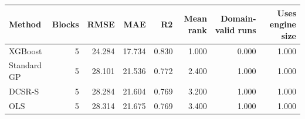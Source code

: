 \begin{tabular}{lrrrrrrr}
\toprule
Method & Blocks & RMSE & MAE & R2 & Mean rank & Domain-valid runs & Uses engine size \\
\midrule
XGBoost & 5 & 24.284 & 17.734 & 0.830 & 1.000 & 0.000 & 1.000 \\
Standard GP & 5 & 28.101 & 21.536 & 0.772 & 2.400 & 1.000 & 1.000 \\
DCSR-S & 5 & 28.284 & 21.604 & 0.769 & 3.200 & 1.000 & 1.000 \\
OLS & 5 & 28.314 & 21.675 & 0.769 & 3.400 & 1.000 & 1.000 \\
\bottomrule
\end{tabular}
